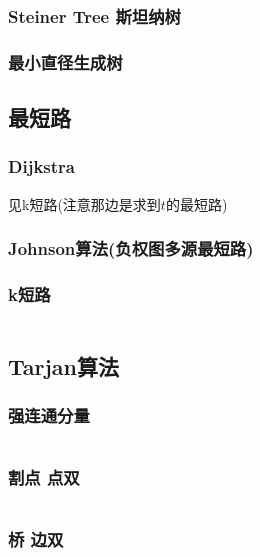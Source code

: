 \documentclass[a4paper, twoside]{article}
\begin{document}
\begin{multicols}{2}
				\subsubsection{Steiner Tree 斯坦纳树}
					
				
				\subsubsection{最小直径生成树}
					
			
			\subsection{最短路}
				\subsubsection{Dijkstra}
					见k短路(注意那边是求到$t$的最短路)
				
				\subsubsection{Johnson算法(负权图多源最短路)}
					
				


				\subsubsection{k短路}
					\inputminted{cpp}{../src/graph/k短路.cpp}
			
			\subsection{Tarjan算法}
				\subsubsection{强连通分量}
					\inputminted{cpp}{../src/graph/强连通分量.cpp}
				
				\subsubsection{割点 点双}
					\inputminted{cpp}{../src/graph/割点点双.cpp}

				\subsubsection{桥 边双}
					\inputminted{cpp}{../src/graph/边双.cpp}


\end{multicols}
\end{document}
